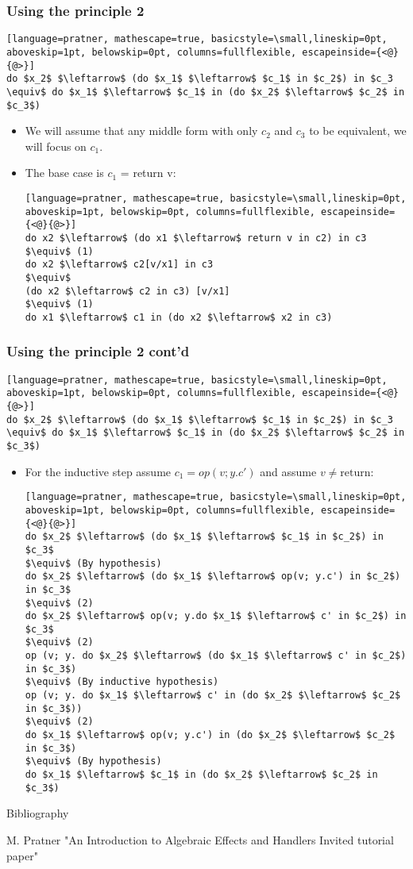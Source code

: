 \documentclass[t]{beamer}
\begin{document}
\begin{frame}[fragile]
	\frametitle{Using the principle 2}
	
	\begin{lstlisting}[language=pratner, mathescape=true, basicstyle=\small,lineskip=0pt, aboveskip=1pt, belowskip=0pt, columns=fullflexible, escapeinside={<@}{@>}]
do $x_2$ $\leftarrow$ (do $x_1$ $\leftarrow$ $c_1$ in $c_2$) in $c_3 \equiv$ do $x_1$ $\leftarrow$ $c_1$ in (do $x_2$ $\leftarrow$ $c_2$ in $c_3$)
	\end{lstlisting}
	
	\begin{itemize}
	\item We will assume that any middle form with only $c_2$ and $c_3$ to be equivalent, we will focus on $c_1$. 
	\item The base case is $c_1$ = return v:
	\begin{lstlisting}[language=pratner, mathescape=true, basicstyle=\small,lineskip=0pt, aboveskip=1pt, belowskip=0pt, columns=fullflexible, escapeinside={<@}{@>}]
do x2 $\leftarrow$ (do x1 $\leftarrow$ return v in c2) in c3 
$\equiv$ (1)
do x2 $\leftarrow$ c2[v/x1] in c3 
$\equiv$
(do x2 $\leftarrow$ c2 in c3) [v/x1]
$\equiv$ (1)
do x1 $\leftarrow$ c1 in (do x2 $\leftarrow$ x2 in c3)
	\end{lstlisting}
	\end{itemize}
\end{frame}
	
\begin{frame}[fragile]
	\frametitle{Using the principle 2 cont'd}
		\begin{lstlisting}[language=pratner, mathescape=true, basicstyle=\small,lineskip=0pt, aboveskip=1pt, belowskip=0pt, columns=fullflexible, escapeinside={<@}{@>}]
do $x_2$ $\leftarrow$ (do $x_1$ $\leftarrow$ $c_1$ in $c_2$) in $c_3 \equiv$ do $x_1$ $\leftarrow$ $c_1$ in (do $x_2$ $\leftarrow$ $c_2$ in $c_3$)
	\end{lstlisting}
	\begin{itemize}
		\item For the inductive step assume $c_1 = op(v; y.c')$ and assume $v\neq \text{return}$:
		\begin{lstlisting}[language=pratner, mathescape=true, basicstyle=\small,lineskip=0pt, aboveskip=1pt, belowskip=0pt, columns=fullflexible, escapeinside={<@}{@>}]
do $x_2$ $\leftarrow$ (do $x_1$ $\leftarrow$ $c_1$ in $c_2$) in $c_3$
$\equiv$ (By hypothesis)
do $x_2$ $\leftarrow$ (do $x_1$ $\leftarrow$ op(v; y.c') in $c_2$) in $c_3$
$\equiv$ (2)
do $x_2$ $\leftarrow$ op(v; y.do $x_1$ $\leftarrow$ c' in $c_2$) in $c_3$
$\equiv$ (2)
op (v; y. do $x_2$ $\leftarrow$ (do $x_1$ $\leftarrow$ c' in $c_2$) in $c_3$)
$\equiv$ (By inductive hypothesis)
op (v; y. do $x_1$ $\leftarrow$ c' in (do $x_2$ $\leftarrow$ $c_2$ in $c_3$))
$\equiv$ (2)
do $x_1$ $\leftarrow$ op(v; y.c') in (do $x_2$ $\leftarrow$ $c_2$ in $c_3$)
$\equiv$ (By hypothesis)
do $x_1$ $\leftarrow$ $c_1$ in (do $x_2$ $\leftarrow$ $c_2$ in $c_3$)
		\end{lstlisting}
	\end{itemize}
\end{frame}
	
\begin{frame}{Bibliography}
	\begin{thebibliography}{100}
	 M. Pratner "An Introduction to Algebraic Effects and Handlers Invited tutorial paper"
\end{thebibliography}
\end{frame}
\end{document}
